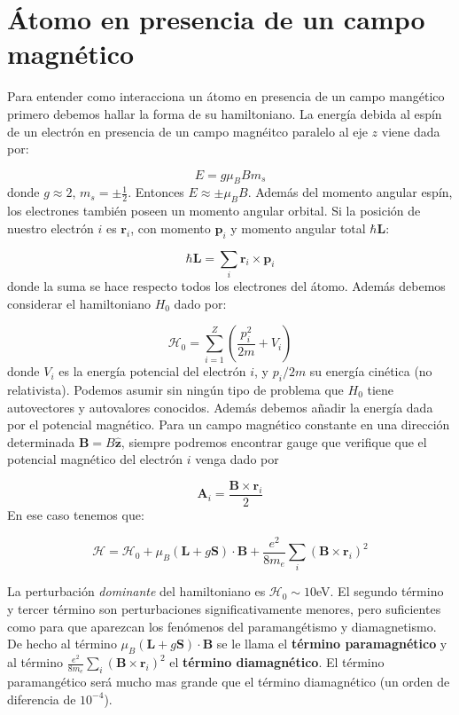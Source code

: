 \documentclass[12pt,a4paper]{book}
\numberwithin{equation}{section}
\numberwithin{figure}{section}
\newcommand{\parentesis}[1]{\left( #1  \right)}
\newcommand{\Hcal}{\mathcal{H}}
\newcommand{\zn}{\mathbf{z}}
\newcommand{\rn}{\mathbf{r}}
\newcommand{\pn}{\mathbf{p}}
\newcommand{\An}{\mathbf{A}}
\newcommand{\Bn}{\mathbf{B}}
\newcommand{\Ln}{\mathbf{L}}
\newcommand{\Sn}{\mathbf{S}}
\newcommand{\hnz}{\hat{\zn}}
\begin{document}
\section{Átomo en presencia de un campo magnético}

Para entender como interacciona un átomo en presencia de un campo mangético primero debemos hallar la forma de su hamiltoniano. La energía debida al espín de un electrón en presencia de un campo magnéitco paralelo al eje $z$ viene dada por:

\begin{equation}
E = g \mu_B B m_s
\end{equation}
donde $g \approx 2$, $m_s = \pm \frac{1}{2}$. Entonces $E \approx \pm \mu_B B$. Además del momento angular espín, los electrones también poseen un momento angular orbital. Si la posición de nuestro electrón $i$ es $\rn_i$, con momento $\pn_i$ y momento angular total $\hbar \Ln$:

\begin{equation}
\hbar \Ln = \sum_i \rn_i \times \pn_i
\end{equation}
donde la suma se hace respecto todos los electrones del átomo. Además debemos considerar el hamiltoniano $H_0$ dado por:

\begin{equation}
\Hcal_0 = \sum_{i=1}^Z \parentesis{\frac{p_i^2}{2m} + V_i}
\end{equation}
donde $V_i$ es la energía potencial del electrón $i$, y $p_i/2m$ su energía cinética (no relativista). Podemos asumir sin ningún tipo de problema que $H_0$ tiene autovectores y autovalores conocidos. Además debemos añadir la energía dada por el potencial magnético. Para un campo magnético constante en una dirección determinada $\Bn = B \hnz$, siempre podremos encontrar gauge que verifique que el potencial magnético del electrón $i$ venga dado por 

\begin{equation}
\An_i = \frac{\Bn \times \rn_i}{2}
\end{equation}
En ese caso tenemos que:

\begin{equation}
\Hcal = \Hcal_0 + \mu_B (\Ln  + g \Sn) \cdot \Bn + \frac{e^2}{8 m_e} \sum_i (\Bn \times \rn_i)^2
\end{equation}

La perturbación \textit{dominante} del hamiltoniano es $\Hcal_0 \sim 10$eV. El segundo término y tercer término son perturbaciones significativamente menores, pero suficientes como para que aparezcan los fenómenos del paramangétismo y diamagnetismo. De hecho al término $\mu_B (\Ln  + g \Sn) \cdot \Bn $ se le llama el \textbf{término paramagnético} y al término $\frac{e^2}{8 m_e} \sum_i (\Bn \times \rn_i)^2$ el \textbf{término diamagnético}. El término paramangético será mucho mas grande que el término diamagnético (un orden de diferencia de $10^{-4}$).
\end{document}
